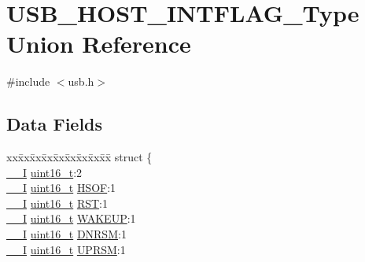 \hypertarget{union_u_s_b___h_o_s_t___i_n_t_f_l_a_g___type}{}\section{U\+S\+B\+\_\+\+H\+O\+S\+T\+\_\+\+I\+N\+T\+F\+L\+A\+G\+\_\+\+Type Union Reference}
\label{union_u_s_b___h_o_s_t___i_n_t_f_l_a_g___type}


{\ttfamily \#include $<$usb.\+h$>$}

\subsection*{Data Fields}
\begin{DoxyCompactItemize}
\item 
\begin{tabbing}
xx\=xx\=xx\=xx\=xx\=xx\=xx\=xx\=xx\=\kill
struct \{\\
\>\mbox{\hyperlink{core__cm0plus_8h_af63697ed9952cc71e1225efe205f6cd3}{\_\_I}} \mbox{\hyperlink{union_u_s_b___h_o_s_t___i_n_t_f_l_a_g___type_a25e8fd3335b0c4872c6e2910bd01f0f6}{uint16\_t}}:2\\
\>\mbox{\hyperlink{core__cm0plus_8h_af63697ed9952cc71e1225efe205f6cd3}{\_\_I}} \mbox{\hyperlink{union_u_s_b___h_o_s_t___i_n_t_f_l_a_g___type_a25e8fd3335b0c4872c6e2910bd01f0f6}{uint16\_t}} \mbox{\hyperlink{union_u_s_b___h_o_s_t___i_n_t_f_l_a_g___type_a357e2a07f0ed5b3b86497b3739ec30a3}{HSOF}}:1\\
\>\mbox{\hyperlink{core__cm0plus_8h_af63697ed9952cc71e1225efe205f6cd3}{\_\_I}} \mbox{\hyperlink{union_u_s_b___h_o_s_t___i_n_t_f_l_a_g___type_a25e8fd3335b0c4872c6e2910bd01f0f6}{uint16\_t}} \mbox{\hyperlink{union_u_s_b___h_o_s_t___i_n_t_f_l_a_g___type_a54d7da8e164892f7b65bf45a0b6f0c75}{RST}}:1\\
\>\mbox{\hyperlink{core__cm0plus_8h_af63697ed9952cc71e1225efe205f6cd3}{\_\_I}} \mbox{\hyperlink{union_u_s_b___h_o_s_t___i_n_t_f_l_a_g___type_a25e8fd3335b0c4872c6e2910bd01f0f6}{uint16\_t}} \mbox{\hyperlink{union_u_s_b___h_o_s_t___i_n_t_f_l_a_g___type_a84bb3fe0a50a407a76cf6111eee40622}{WAKEUP}}:1\\
\>\mbox{\hyperlink{core__cm0plus_8h_af63697ed9952cc71e1225efe205f6cd3}{\_\_I}} \mbox{\hyperlink{union_u_s_b___h_o_s_t___i_n_t_f_l_a_g___type_a25e8fd3335b0c4872c6e2910bd01f0f6}{uint16\_t}} \mbox{\hyperlink{union_u_s_b___h_o_s_t___i_n_t_f_l_a_g___type_ab5bd7c625b55873db00571bb99d7800b}{DNRSM}}:1\\
\>\mbox{\hyperlink{core__cm0plus_8h_af63697ed9952cc71e1225efe205f6cd3}{\_\_I}} \mbox{\hyperlink{union_u_s_b___h_o_s_t___i_n_t_f_l_a_g___type_a25e8fd3335b0c4872c6e2910bd01f0f6}{uint16\_t}} \mbox{\hyperlink{union_u_s_b___h_o_s_t___i_n_t_f_l_a_g___type_a967d41d70af5b8569d8b5ab91c56369e}{UPRSM}}:1\\

\end{tabbing}
\end{DoxyCompactItemize}
